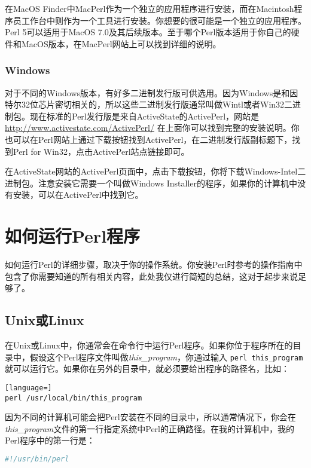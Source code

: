 在MacOS Finder中MacPerl作为一个独立的应用程序进行安装，而在Macintosh程序员工作台中则作为一个工具进行安装。你想要的很可能是一个独立的应用程序。Perl 5可以适用于MacOS 7.0及其后续版本。至于哪个Perl版本适用于你自己的硬件和MacOS版本，在MacPerl网站上可以找到详细的说明。

\subsubsection{Windows}
对于不同的Windows版本，有好多二进制发行版可供选用。因为Windows是和因特尔32位芯片密切相关的，所以这些二进制发行版通常叫做Wintl或者Win32二进制包。现在标准的Perl发行版是来自ActiveState的ActivePerl，网站是 \href{http://www.activestate.com/ActivePerl/}{http://www.activestate.com/ActivePerl/} 在上面你可以找到完整的安装说明。你也可以在Perl网站上通过下载按钮找到ActivePerl，在二进制发行版副标题下，找到Perl for Win32，点击ActivePerl站点链接即可。

在ActiveState网站的ActivePerl页面中，点击下载按钮，你将下载Windows-Intel二进制包。注意安装它需要一个叫做Windows Installer的程序，如果你的计算机中没有安装，可以在ActivePerl中找到它。

\section{如何运行Perl程序}
如何运行Perl的详细步骤，取决于你的操作系统。你安装Perl时参考的操作指南中包含了你需要知道的所有相关内容，此处我仅进行简短的总结，这对于起步来说足够了。

\subsection{Unix或Linux}
在Unix或Linux中，你通常会在命令行中运行Perl程序。如果你位于程序所在的目录中，假设这个Perl程序文件叫做\textit{this\_program}，你通过输入 \verb|perl this_program|就可以运行它。如果你在另外的目录中，就必须要给出程序的路径名，比如：

\begin{lstlisting}[language=]
perl /usr/local/bin/this_program
\end{lstlisting}

因为不同的计算机可能会把Perl安装在不同的目录中，所以通常情况下，你会在\textit{this\_program}文件的第一行指定系统中Perl的正确路径。在我的计算机中，我的Perl程序中的第一行是：

\begin{lstlisting}[language=bash]
#!/usr/bin/perl
\end{lstlisting}

